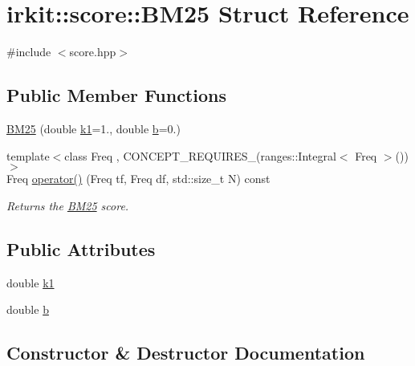 \hypertarget{structirkit_1_1score_1_1BM25}{}\section{irkit\+:\+:score\+:\+:B\+M25 Struct Reference}
\label{structirkit_1_1score_1_1BM25}


{\ttfamily \#include $<$score.\+hpp$>$}

\subsection*{Public Member Functions}
\begin{DoxyCompactItemize}
\item 
\mbox{\hyperlink{structirkit_1_1score_1_1BM25_ab3914ee4121fac4d7d911b2be83a3c01}{B\+M25}} (double \mbox{\hyperlink{structirkit_1_1score_1_1BM25_a466bb269c6c56714e0148d428bd7e1d5}{k1}}=1., double \mbox{\hyperlink{structirkit_1_1score_1_1BM25_ab68733f61f341e9fe744540192ae5b7c}{b}}=0.)
\item 
{\footnotesize template$<$class Freq , C\+O\+N\+C\+E\+P\+T\+\_\+\+R\+E\+Q\+U\+I\+R\+E\+S\+\_\+(ranges\+::\+Integral$<$ Freq $>$()) $>$ }\\Freq \mbox{\hyperlink{structirkit_1_1score_1_1BM25_a11129a12cf8c95384d6ceb23b68f39ed}{operator()}} (Freq tf, Freq df, std\+::size\+\_\+t N) const
\begin{DoxyCompactList}\small\item\em Returns the \mbox{\hyperlink{structirkit_1_1score_1_1BM25}{B\+M25}} score. \end{DoxyCompactList}\end{DoxyCompactItemize}
\subsection*{Public Attributes}
\begin{DoxyCompactItemize}
\item 
double \mbox{\hyperlink{structirkit_1_1score_1_1BM25_a466bb269c6c56714e0148d428bd7e1d5}{k1}}
\item 
double \mbox{\hyperlink{structirkit_1_1score_1_1BM25_ab68733f61f341e9fe744540192ae5b7c}{b}}
\end{DoxyCompactItemize}


\subsection{Constructor \& Destructor Documentation}
\mbox{\label{structirkit_1_1score_1_1BM25_ab3914ee4121fac4d7d911b2be83a3c01}} 

